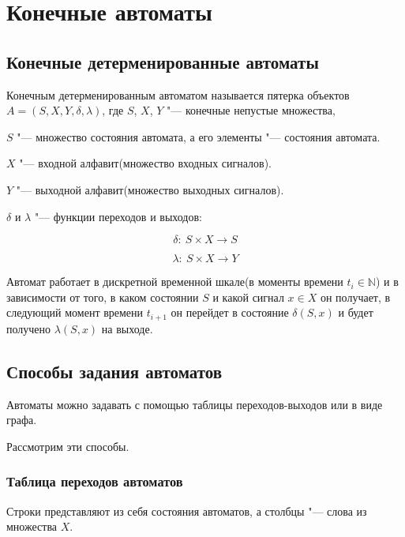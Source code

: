 \section{Конечные автоматы}

\subsection{Конечные детерменированные автоматы}

Конечным детерменированным автоматом 
называется пятерка объектов $A = (S, X, Y, \delta, \lambda)$, где
$S$, $X$, $Y$ "--- конечные непустые множества, 

$S$ "--- множество состояния
автомата, а его элементы "--- состояния автомата.

$X$ "--- входной алфавит(множество входных сигналов).

$Y$ "--- выходной алфавит(множество выходных сигналов).

$\delta$ и $\lambda$ "--- функции переходов и выходов:

\begin{equation*}
    \delta: ~ S \times X \rightarrow S
\end{equation*}

\begin{equation*}
    \lambda: ~ S \times X \rightarrow Y
\end{equation*}

Автомат работает в дискретной временной шкале(в моменты времени $t_i \in \mathbb{N}$)
и в зависимости от того, в каком состоянии $S$ и какой сигнал $x \in X$ он получает, 
в следующий момент времени $t_{i+1}$ он перейдет в состояние $\delta(S, x)$ и
будет получено $\lambda(S, x)$ на выходе.

\subsection{Способы задания автоматов}

Автоматы можно задавать с помощью таблицы переходов-выходов или в виде
графа.

Рассмотрим эти способы.

\subsubsection{Таблица переходов автоматов}

Строки представляют из себя состояния автоматов, а столбцы "--- слова из множества $X$.


